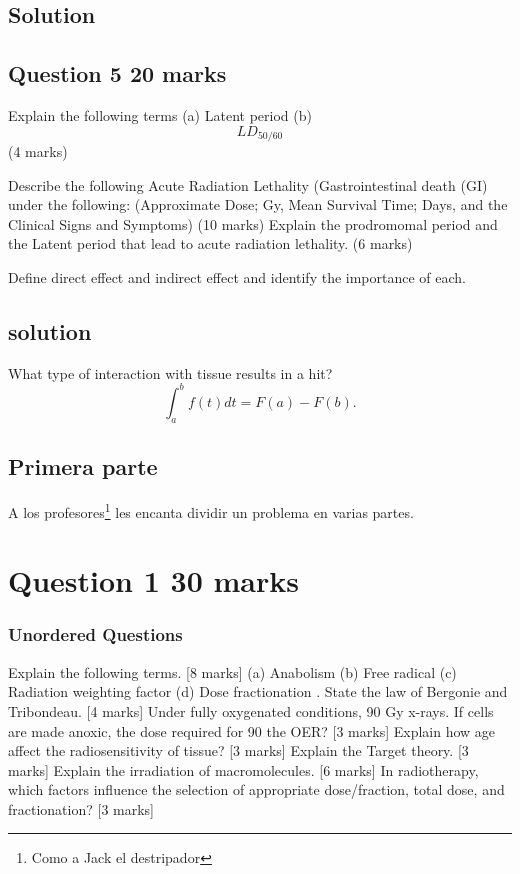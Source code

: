 \documentclass{assignment}
\begin{document}
\begin{problem}
\subsection{Solution}
\subsection*{Question 5 20 marks}
\noindent Explain the following terms (a) Latent period (b) \begin{equation}
    LD_{50/60}
\end{equation}(4 marks)

\noindent Describe the following Acute Radiation Lethality (Gastrointestinal death (GI) under the following:
(Approximate Dose; Gy, Mean Survival Time; Days, and the Clinical Signs and Symptoms) (10 marks)
\noindent Explain the prodromomal period and the Latent period that lead to acute radiation lethality. (6 marks)

\noindent Define direct effect and indirect effect and identify the importance of each.
\subsection{solution}
\noindent What type of interaction with tissue results in a hit?
\begin{equation}\label{eq:TeoremaFundamental}
    \int_a^b f(t)dt = F(a)-F(b).
\end{equation}
\subsection{Primera parte}

\noindent A los profesores\footnote{Como a Jack el destripador} les encanta dividir un problema en varias partes.
\section*{Question 1 30 marks}
\subsubsection*{Unordered Questions}
 Explain the following terms. [8 marks]
(a) Anabolism (b) Free radical
(c) Radiation weighting factor (d) Dose fractionation
. State the law of Bergonie and Tribondeau. [4 marks]
\noindent Under fully oxygenated conditions, 90 %
Gy x-rays. If cells are made anoxic, the dose required for 90%
the OER? [3 marks]
\noindent Explain how age affect the radiosensitivity of tissue? [3 marks]
\noindent Explain the Target theory. [3 marks]
\noindent Explain the irradiation of macromolecules. [6 marks]
\noindent In radiotherapy, which factors influence the selection of appropriate dose/fraction, total
dose, and fractionation? [3 marks]

\end{problem}
\end{document}
